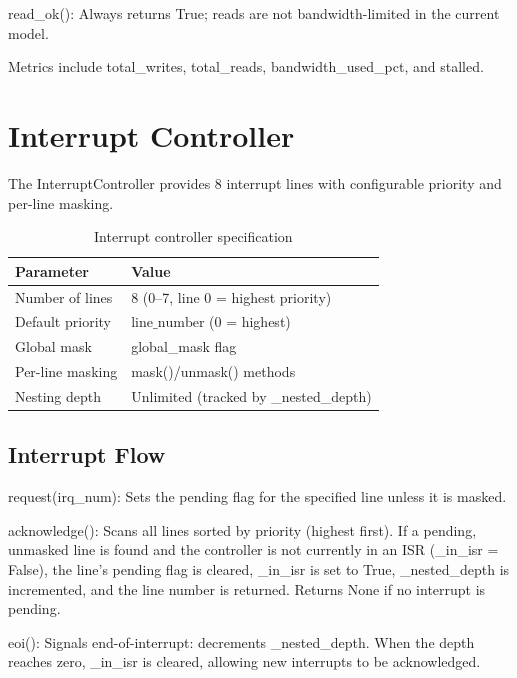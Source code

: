 \documentclass[12pt,a4paper,twoside]{book}
\theoremstyle{trinarytheorem}
\theoremstyle{trinarydefinition}
\newcommand{\code}[1]{\textsf{#1}}
\begin{document}
\noindent\code{read\_ok()}: Always returns \code{True}; reads are not
bandwidth-limited in the current model.

Metrics include \code{total\_writes}, \code{total\_reads},
\code{bandwidth\_used\_pct}, and \code{stalled}.

\section{Interrupt Controller}

The \code{InterruptController} provides 8 interrupt lines with
configurable priority and per-line masking.

\begin{table}[H]
\centering
\caption{Interrupt controller specification}
\label{tab:intcparams}
\begin{tabular}{ll}
\toprule
Parameter & Value \\
\midrule
Number of lines & 8 (0--7, line 0 = highest priority) \\
Default priority & $\text{line\_number}$ (0 = highest) \\
Global mask & \code{global\_mask} flag \\
Per-line masking & \code{mask()}/\code{unmask()} methods \\
Nesting depth & Unlimited (tracked by \code{\_nested\_depth}) \\
\bottomrule
\end{tabular}
\end{table}

\subsection{Interrupt Flow}

\noindent\code{request(irq\_num)}: Sets the pending flag for the
specified line unless it is masked.

\noindent\code{acknowledge()}: Scans all lines sorted by priority
(highest first). If a pending, unmasked line is found and the controller
is not currently in an ISR (\code{\_in\_isr = False}), the line's pending
flag is cleared, \code{\_in\_isr} is set to \code{True},
\code{\_nested\_depth} is incremented, and the line number is returned.
Returns \code{None} if no interrupt is pending.

\noindent\code{eoi()}: Signals end-of-interrupt: decrements
\code{\_nested\_depth}. When the depth reaches zero, \code{\_in\_isr}
is cleared, allowing new interrupts to be acknowledged.
\end{document}
